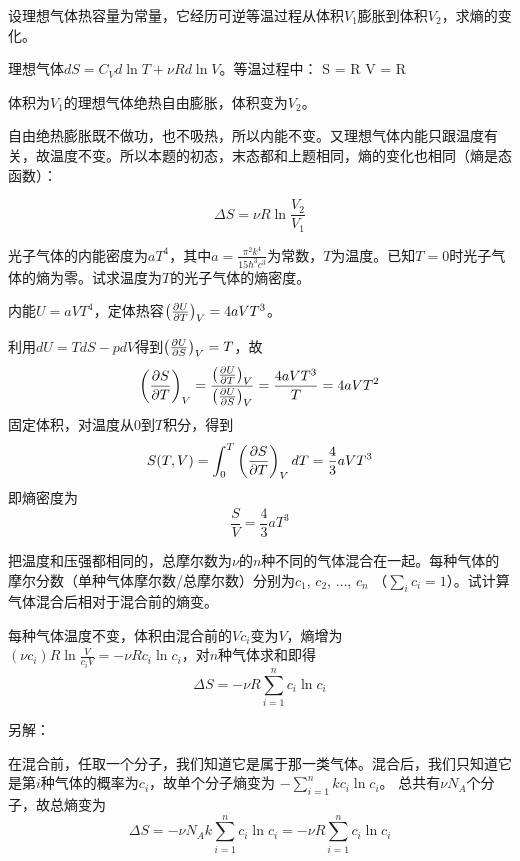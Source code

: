 \documentclass[CJK]{beamer}
\begin{document}
\begin{frame}
\bch
{\blue 设理想气体热容量为常量，它经历可逆等温过程从体积$V_1$膨胀到体积$V_2$，求熵的变化。}

\skipline

{
理想气体$dS = C_V d\ln T + \nu R d\ln V$。等温过程中：
\bea
\Delta S = \nu R \Delta \ln V = \nu R \ln{}
\eea
}
\ech
\end{frame}

\begin{frame}
\bch
{\blue 体积为$V_1$的理想气体绝热自由膨胀，体积变为$V_2$。}

自由绝热膨胀既不做功，也不吸热，所以内能不变。又理想气体内能只跟温度有关，故温度不变。所以本题的初态，末态都和上题相同，熵的变化也相同（熵是态函数）：

$$ \Delta S = \nu R \ln\frac{V_2}{V_1}$$


\ech
\end{frame}




\begin{frame}
\bch
{\blue 光子气体的内能密度为$aT^4$，其中$a=\frac{\pi^2 k^4}{15\hbar^3c^3}$为常数，$T$为温度。已知$T=0$时光子气体的熵为零。试求温度为$T$的光子气体的熵密度。}

\skipline
{
内能$U=aVT^4$，定体热容$\left(\frac{\partial U}{\partial T}\right)_{V} = 4aVT^3$。

利用$dU = TdS - p dV$得到$\left(\frac{\partial U}{\partial S}\right)_{V} = T$，故
$$\left(\frac{\partial S}{\partial T}\right)_{V} = \frac{\left(\frac{\partial U}{\partial T}\right)_{V}}{\left(\frac{\partial U}{\partial S}\right)_{V}} = \frac{4aVT^3}{T} = 4aVT^2$$
固定体积，对温度从$0$到$T$积分，得到
$$ S(T, V) = \int_0^T \left(\frac{\partial S}{\partial T}\right)_{V} dT = \frac{4}{3}aVT^3 $$
即熵密度为
$$ \frac{S}{V}= \frac{4}{3}aT^3$$
}
\ech
\end{frame}


\begin{frame}
\bch
{\blue 把温度和压强都相同的，总摩尔数为$\nu$的$n$种不同的气体混合在一起。每种气体的摩尔分数（单种气体摩尔数/总摩尔数）分别为$c_1$, $c_2$, $\ldots$, $c_n$ （$\sum_i c_i = 1$）。试计算气体混合后相对于混合前的熵变。}

\skipline

{\small
每种气体温度不变，体积由混合前的$Vc_i$变为$V$，熵增为$(\nu c_i) R\ln \frac{V}{c_iV} = - \nu R c_i\ln c_i$，对$n$种气体求和即得
$$\Delta S =   -\nu R \sum_{i=1}^n c_i \ln c_i$$}

\skipline

{\scriptsize
另解：

在混合前，任取一个分子，我们知道它是属于那一类气体。混合后，我们只知道它是第$i$种气体的概率为$c_i$，故单个分子熵变为
$-\sum_{i=1}^{n} kc_i\ln c_i $。 总共有$ \nu N_A $个分子，故总熵变为
$$ \Delta S =  -\nu N_A k\sum_{i=1}^n c_i \ln c_i = -\nu R \sum_{i=1}^n c_i \ln c_i$$  
}
\ech
\end{frame}
\end{document}
